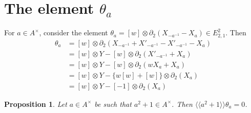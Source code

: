 \documentclass[11pt]{amsart}
\theoremstyle{definition}
\theoremstyle{plain}
\newtheorem{prp}[ntn]{Proposition}
\theoremstyle{definition}
\numberwithin{equation}{section}
\renewcommand{\aa}{{A^\times}}
\newcommand{\Lan}{\langle \! \langle}
\newcommand{\Ran}{\rangle \! \rangle}
\begin{document}
	\section{The element \texorpdfstring{$\theta_a$}{Oa}}
	For $a\in\aa$, consider the element $\theta_a=[w]\otimes\partial_2(X_{-a^{-1}}-X_a)\in E^2_{2,1}$. Then
	\begin{equation}
		\label{tht-id}
		\begin{split}
			\theta_a&=[w]\otimes\partial_2(X_{-a^{-1}}+X'_{-a^{-1}}-X'_{-a^{-1}}-X_a)\\
			&=[w]\otimes Y - [w]\otimes\partial_2(X'_{-a^{-1}}+X_a)\\
			&=[w]\otimes Y - [w]\otimes\partial_2(wX_a+X_a)\\
			&=[w]\otimes Y - \{w[w]+[w]\}\otimes\partial_2(X_a)\\
			&=[w]\otimes Y - [-1]\otimes\partial_2(X_a)
		\end{split}
	\end{equation}
	\begin{prp}
		\label{sqr-plus-tht}
		Let $a\in\aa$ be such that $a^2+1\in\aa$. Then $\Lan a^2+1\Ran\theta_a=0$.
	\end{prp}
\end{document}

